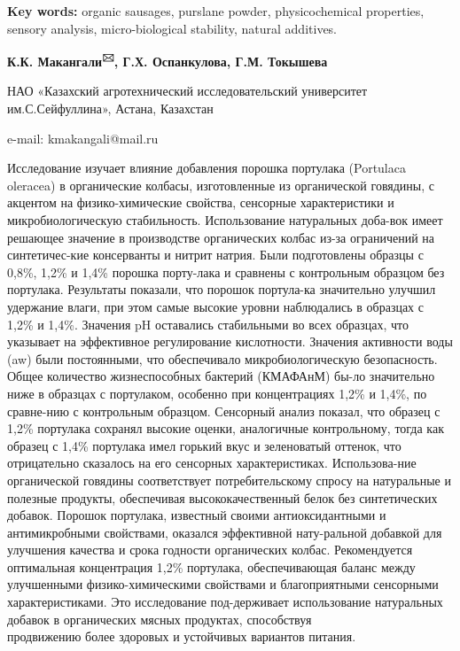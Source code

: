 {\bfseries Key words:} organic sausages, purslane powder, physicochemical
properties, sensory analysis, micro-biological stability, natural
additives.

\begin{center}

{\bfseries К.К. Макангали\textsuperscript{🖂}, Г.Х. Оспанкулова, Г.М.
Токышева}

НАО «Казахский агротехнический исследовательский университет
им.С.Сейфуллина», Астана, Казахстан

e-mail: kmakangali@mail.ru
\end{center}

Исследование изучает влияние добавления порошка портулака (Portulaca
oleracea) в органические колбасы, изготовленные из органической
говядины, с акцентом на физико-химические свойства, сенсорные
характеристики и микробиологическую стабильность. Использование
натуральных доба-вок имеет решающее значение в производстве органических
колбас из-за ограничений на синтетичес-кие консерванты и нитрит натрия.
Были подготовлены образцы с 0,8\%, 1,2\% и 1,4\% порошка порту-лака и
сравнены с контрольным образцом без портулака. Результаты показали, что
порошок портула-ка значительно улучшил удержание влаги, при этом самые
высокие уровни наблюдались в образцах с 1,2\% и 1,4\%. Значения pH
оставались стабильными во всех образцах, что указывает на эффективное
регулирование кислотности. Значения активности воды (aw) были
постоянными, что обеспечивало микробиологическую безопасность. Общее
количество жизнеспособных бактерий (КМАФАнМ) бы-ло значительно ниже в
образцах с портулаком, особенно при концентрациях 1,2\% и 1,4\%, по
сравне-нию с контрольным образцом. Сенсорный анализ показал, что образец
с 1,2\% портулака сохранял высокие оценки, аналогичные контрольному,
тогда как образец с 1,4\% портулака имел горький вкус и зеленоватый
оттенок, что отрицательно сказалось на его сенсорных характеристиках.
Использова-ние органической говядины соответствует потребительскому
спросу на натуральные и полезные продукты, обеспечивая
высококачественный белок без синтетических добавок. Порошок портулака,
известный своими антиоксидантными и антимикробными свойствами, оказался
эффективной нату-ральной добавкой для улучшения качества и срока годности
органических колбас. Рекомендуется оптимальная концентрация 1,2\%
портулака, обеспечивающая баланс между улучшенными физико-химическими
свойствами и благоприятными сенсорными характеристиками. Это
исследование под-держивает использование натуральных добавок в
органических мясных продуктах, способствуя \\продвижению более здоровых и
устойчивых вариантов питания.


